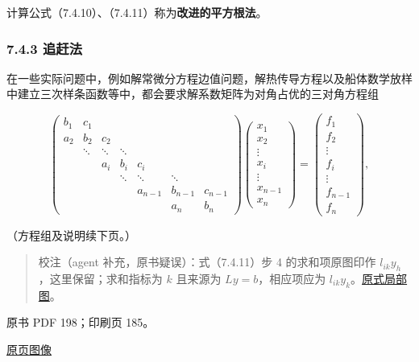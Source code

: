 \documentclass[
  10pt,
  fontset=fandol]{ctexart}
\begin{document}
计算公式（7.4.10）、（7.4.11）称为\textbf{改进的平方根法}。

\subsubsection{7.4.3 追赶法}\label{ux8ffdux8d76ux6cd5}

在一些实际问题中，例如解常微分方程边值问题，解热传导方程以及船体数学放样中建立三次样条函数等中，都会要求解系数矩阵为对角占优的三对角方程组

\[
\begin{pmatrix}
b_1&c_1&&&&&\\
a_2&b_2&c_2&&&&\\
&\ddots&\ddots&\ddots&&&\\
&&a_i&b_i&c_i&&\\
&&&\ddots&\ddots&\ddots&\\
&&&&a_{n-1}&b_{n-1}&c_{n-1}\\
&&&&&a_n&b_n
\end{pmatrix}
\begin{pmatrix}x_1\\x_2\\\vdots\\x_i\\\vdots\\x_{n-1}\\x_n\end{pmatrix}
=
\begin{pmatrix}f_1\\f_2\\\vdots\\f_i\\\vdots\\f_{n-1}\\f_n\end{pmatrix},
\]

（方程组及说明续下页。）

\begin{quote}
校注（agent 补充，原书疑误）：式（7.4.11）步 4 的求和项原图印作
\(l_{ik}y_h\)，这里保留；求和指标为 \(k\) 且来源为 \(Ly=b\)，相应项应为
\(l_{ik}y_k\)。\href{/Users/xiangjunfeng/Desktop/数值计算专用/numerical-analysis/book/staging/ch07b/assets/197-solves.png}{原式局部图}。
\end{quote}

\clearpage

原书 PDF 198；印刷页 185。

\href{/Users/xiangjunfeng/Desktop/数值计算专用/numerical-analysis/book/source-images/pdf-198.jpeg}{原页图像}
\end{document}
